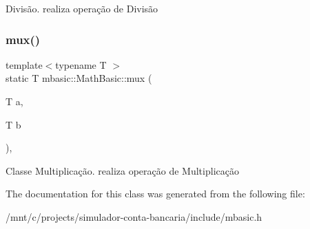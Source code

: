 Divisão. realiza operação de Divisão \mbox{\label{classmbasic_1_1MathBasic_a592bea5152d67298a2d60b4438fc9357}} 
\subsubsection{\texorpdfstring{mux()}{mux()}}
{\footnotesize\ttfamily template$<$typename T $>$ \\
static T mbasic\+::\+Math\+Basic\+::mux (\begin{DoxyParamCaption}\item[{T}]{a,  }\item[{T}]{b }\end{DoxyParamCaption})\hspace{0.3cm}{\ttfamily [inline]}, {\ttfamily [static]}}

Classe Multiplicação. realiza operação de Multiplicação 

The documentation for this class was generated from the following file\+:\begin{DoxyCompactItemize}
\item 
/mnt/c/projects/simulador-\/conta-\/bancaria/include/mbasic.\+h\end{DoxyCompactItemize}
